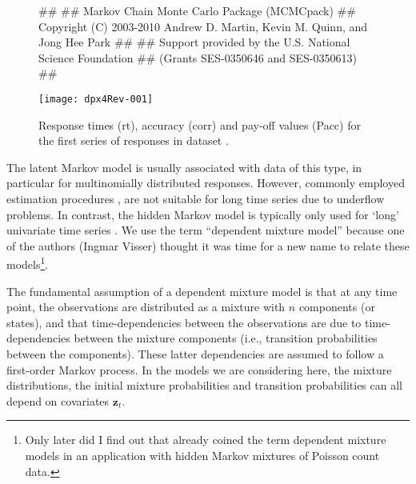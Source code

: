 \documentclass[article]{jss}
\newcommand{\vc}{\mathbf}
\newcommand{\greekv}[1]{\mbox{\boldmath$\mathrm{#1}$}}
\begin{document}
\begin{figure}[htbp]
\begin{center}
\begin{Schunk}
\begin{Soutput}
##
## Markov Chain Monte Carlo Package (MCMCpack)
## Copyright (C) 2003-2010 Andrew D. Martin, Kevin M. Quinn, and Jong Hee Park
##
## Support provided by the U.S. National Science Foundation
## (Grants SES-0350646 and SES-0350613)
##
\end{Soutput}
\end{Schunk}
\texttt{[image: dpx4Rev-001]}
	 \caption{Response times (rt), accuracy (corr) and pay-off values (Pacc) for
	  the first series of responses in dataset .}
	  \label{fig:speed}
	  
\end{center}
\end{figure}

The latent Markov model is usually associated with data of this type,
in particular for multinomially distributed responses.  However,
commonly employed estimation procedures \citep[e.g.,][]{Pol1996}, are
not suitable for long time series due to underflow problems.  In
contrast, the hidden Markov model is typically only used for `long'
univariate time series \citep[][chapter~1]{Cappe2005}.  We use the
term ``dependent mixture model'' because one of the authors (Ingmar
Visser) thought it was time for a new name to relate these
models\footnote{Only later did I find out that \citet{Leroux1992}
already coined the term dependent mixture models in an application
with hidden Markov mixtures of Poisson count data.}.

The fundamental assumption of a dependent mixture model is that at any
time point, the observations are distributed as a mixture with $n$
components (or states), and that time-dependencies between the
observations are due to time-dependencies between the mixture
components (i.e., transition probabilities between the components).
These latter dependencies are assumed to follow a first-order Markov
process.  In the models we are considering here, the mixture
distributions, the initial mixture probabilities and transition
probabilities can all depend on covariates $\vc{z}_t$.

\end{document}
